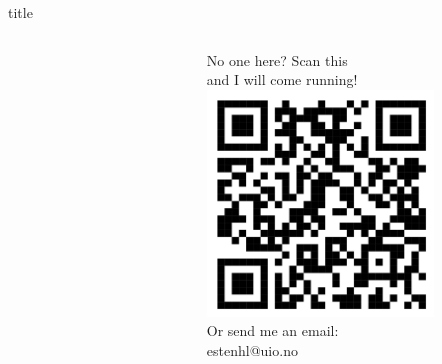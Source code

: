 \documentclass[final, pt]{beamer}
\begin{document}
    \begin{frame}[t]
        \thispagestyle{empty}

        \begin{beamercolorbox}[sep=0em,wd=\textwidth]{title}
            \begin{columns}
                \begin{column}{0.2\textwidth}
                \end{column}
                \begin{column}{0.6\textwidth}
                    \centering\\[2.3cm]
                    \vspace{2.3cm}
                \end{column}
                \begin{column}{0.2\textwidth}
                    \hfill
                    \begin{minipage}{0.8\textwidth}
                        \centering
                        No one here? Scan this\\[-0.2cm]
                        and I will come running!\\[0.5cm]
                        \includegraphics[height=6cm]{data/qr.png}\\
                        Or send me an email:\\[-0.2cm]
                        estenhl@uio.no
                    \end{minipage}
                    \hspace{1.2cm}
                \end{column}
            \end{columns}
        \end{beamercolorbox}


\end{frame}
\end{document}
